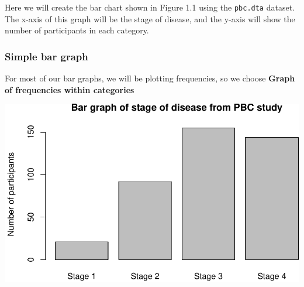 \documentclass[
]{memoir}
\newenvironment{Shaded}{\begin{snugshade}}{\end{snugshade}}
\newcommand{\AttributeTok}[1]{\textcolor[rgb]{0.77,0.63,0.00}{#1}}
\newcommand{\CommentTok}[1]{\textcolor[rgb]{0.56,0.35,0.01}{\textit{#1}}}
\newcommand{\DecValTok}[1]{\textcolor[rgb]{0.00,0.00,0.81}{#1}}
\newcommand{\FunctionTok}[1]{\textcolor[rgb]{0.00,0.00,0.00}{#1}}
\newcommand{\NormalTok}[1]{#1}
\newcommand{\OtherTok}[1]{\textcolor[rgb]{0.56,0.35,0.01}{#1}}
\newcommand{\SpecialCharTok}[1]{\textcolor[rgb]{0.00,0.00,0.00}{#1}}
\newcommand{\StringTok}[1]{\textcolor[rgb]{0.31,0.60,0.02}{#1}}
\begin{document}
Here we will create the bar chart shown in Figure 1.1 using the \texttt{pbc.dta} dataset. The x-axis of this graph will be the stage of disease, and the y-axis will show the number of participants in each category.

\hypertarget{simple-bar-graph}{%
\subsubsection{Simple bar graph}\label{simple-bar-graph}}

For most of our bar graphs, we will be plotting frequencies, so we choose \textbf{Graph of frequencies within categories}

\begin{Shaded}
\end{Shaded}

\includegraphics{01-IntroToR_files/figure-latex/unnamed-chunk-34-1.pdf}
\end{document}
